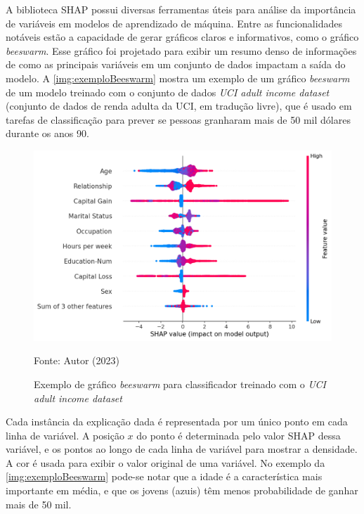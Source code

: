 A biblioteca SHAP possui diversas ferramentas úteis para análise da importância de variáveis em modelos de aprendizado de máquina. Entre as funcionalidades notáveis estão a capacidade de gerar gráficos claros e informativos, como o gráfico \textit{beeswarm}. Esse gráfico foi projetado para exibir um resumo denso de informações de como as principais variáveis em um conjunto de dados impactam a saída do modelo. A \autoref{img:exemploBeeswarm} mostra um exemplo de um gráfico \textit{beeswarm} de um modelo treinado com o conjunto de dados \textit{UCI adult income dataset} (conjunto de dados de renda adulta da UCI, em tradução livre), que é usado em tarefas de classificação para prever se pessoas granharam mais de 50 mil dólares durante os anos 90.

\begin{figure}[H]
	\centering
	\caption{\label{img:exemploBeeswarm}Exemplo de gráfico \textit{beeswarm} para classificador treinado com o \textit{UCI adult income dataset}}
	\includegraphics[scale=0.7]{USPSC-img/exemplo_beeswarm.png}
	\begin{center}
		Fonte: Autor (2023)
	\end{center}
\end{figure}

Cada instância da explicação dada é representada por um único ponto em cada linha de variável. A posição $x$ do ponto é determinada pelo valor SHAP dessa variável, e os pontos  ao longo de cada linha de variável para mostrar a densidade. A cor é usada para exibir o valor original de uma variável. No exemplo da \autoref{img:exemploBeeswarm} pode-se notar que a idade é a característica mais importante em média, e que os jovens (azuis) têm menos probabilidade de ganhar mais de 50 mil.

